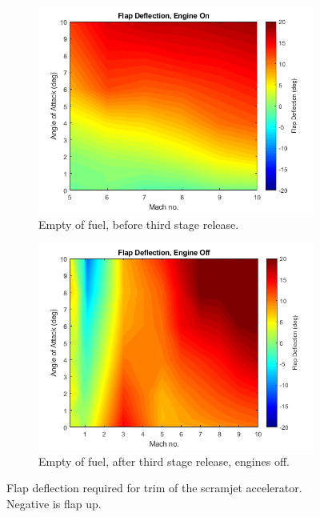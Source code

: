 \begin{figure}[ht]
\begin{subfigure}{.5\textwidth}
			\end{subfigure}
			\begin{subfigure}{.5\textwidth}
				\centering
				\includegraphics[width=0.99\linewidth]{figures/3_vehicle_design/FlapEngineCG3}
				\caption{Empty of fuel, before third stage release.}
				
			\end{subfigure}
			\begin{subfigure}{.5\textwidth}
				\centering
				\includegraphics[width=0.99\linewidth]{figures/3_vehicle_design/FlapNoEngineCG4}
				\caption{Empty of fuel, after third stage release, engines off.}
				
			\end{subfigure}
			\caption{Flap deflection required for trim of the scramjet accelerator. Negative is flap up.} %
			\label{fig:FlapDeflection}
		\end{figure}
		
